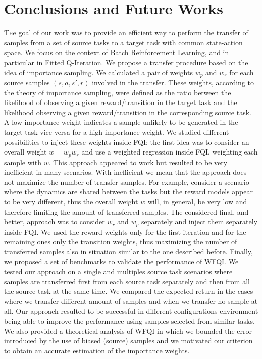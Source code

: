 \chapter{Conclusions and Future Works}
  \vspace{2cm}
  \lettrine[lines=2]{T}he goal of our work was to provide an efficient way to perform the transfer
  of samples from a set of source tasks to a target task with common state-action space.
  We focus on the context of Batch Reinforcement Learning, and in particular in Fitted Q-Iteration.
  We propose a transfer procedure based on the idea of importance sampling. We calculated a pair
  of weights $w_p$ and $w_r$ for each source samples $(s,a,s',r)$ involved in the transfer. These
  weights, according to the theory of importance sampling, were defined as the ratio between the
  likelihood of observing a given reward/transition in the target task and the likelihood observing
  a given reward/transition in the corresponding source task. A low importance weight indicates a sample
  unlikely to be generated in the target task vice versa for a high importance weight.\newline
  We studied different possibilities to inject these weights inside FQI: the first idea was to
  consider an overall weight $w = w_p w_r$ and use a weighted regression inside FQI, weighting
  each sample with $w$. This approach appeared to work but resulted to be very inefficient
  in many scenarios. With inefficient we mean that the approach does not maximize the number of
  transfer samples. For example, consider a scenario where the dynamics are shared between
  the tasks but the reward models appear to be very different, thus the overall weight $w$
  will, in general, be very low and therefore limiting the amount of transferred samples.
  The considered final, and better, approach was to consider $w_r$ and $w_p$ separately and
  inject them separately inside FQI. We used the reward weights only for the first iteration
  and for the remaining ones only the transition weights, thus maximizing the number of
  transferred samples also in situation similar to the one described before.\newline
  Finally, we proposed a set of benchmarks to validate the performance of WFQI. We tested
  our approach on a single and multiples source task scenarios where samples are transferred
  first from each source task separately and then from all the source task at the same time.
  We compared the expected return in the cases where we transfer different amount of samples
  and when we transfer no sample at all. Our approach resulted to be successful in different
  configurations environment being able to improve the performance using samples selected
  from similar tasks. We also provided a theoretical analysis of WFQI in which we bounded the
  error introduced by the use of biased (source) samples and we motivated our criterion to
  obtain an accurate estimation of the importance weights.\newline

